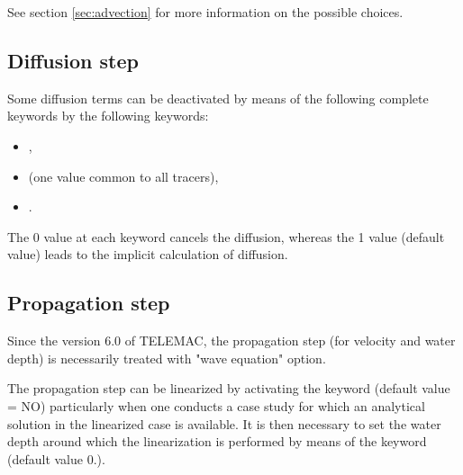See section \ref{sec:advection} for more information on the possible choices.

\subsection{Diffusion step}
\label{sec:difstep}

Some diffusion terms can be deactivated by means of the following complete
keywords by the following keywords:

\begin{itemize}
\item {},

\item {} (one value common to all tracers),

\item {}.
\end{itemize}

The 0 value at each keyword cancels the diffusion, whereas the 1 value
(default value) leads to the implicit calculation of diffusion.



\subsection{Propagation step}


Since the version 6.0 of TELEMAC, the propagation step (for velocity and water
depth) is necessarily treated with  "wave equation" option.

The propagation step can be linearized by activating the keyword
 (default value = NO) particularly when one
conducts a case study for which an analytical solution in the linearized case
is available. It is then necessary to set the water depth around which the
linearization is performed by means of the keyword  (default value 0.).

